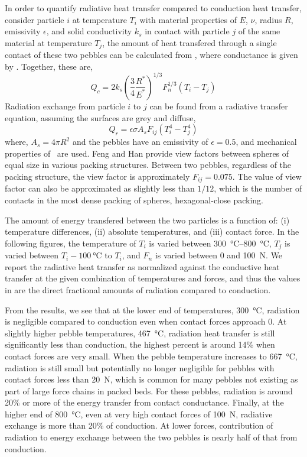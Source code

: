 In order to quantify radiative heat transfer compared to conduction heat transfer, consider particle $i$ at temperature $T_i$ with material properties of $E$, $\nu$, radius $R$, emissivity $\epsilon$, and solid conductivity $k_s$ in contact with particle $j$ of the same material at temperature $T_j$, the amount of heat transfered through a single contact of these two pebbles can be calculated from , where conductance is given by . Together, these are,
\begin{equation}
Q_c = 2k_s\left(\frac{3}{4}\frac{R^*}{E^*}\right)^{1/3}F_n^{1/3} (T_i - T_j)
\end{equation}
Radiation exchange from particle $i$ to $j$ can be found from a radiative transfer equation, assuming the surfaces are grey and diffuse,
\begin{equation}
Q_r = \epsilon\sigma A_sF_{ij}\left(T_i^{4} - T_j^{4}\right)
\end{equation}
where, $A_s = 4\pi R^2$ and the pebbles have an emissivity of $\epsilon = 0.5$, and mechanical properties of \lit~are used. Feng and Han provide view factors between spheres of equal size in various packing structures.\cite{Feng2012} Between two pebbles, regardless of the packing structure, the view factor is approximately $F_{ij} = 0.075$. The value of view factor can also be approximated as slightly less than $1/12$, which is the number of contacts in the most dense packing of spheres, hexagonal-close packing. 

The amount of energy transfered between the two particles is a function of: (i) temperature differences, (ii) absolute temperatures, and (iii) contact force. In the following figures, the temperature of $T_i$ is varied between \SIrange{300}{800}{\celsius}, $T_j$ is varied between $T_i - \SI{100}{\celsius}$ to $T_i$, and $F_n$ is varied between 0 and \SI{100}{\newton}. We report the radiative heat transfer as normalized against the conductive heat transfer at the given combination of temperatures and forces, and thus the values in  are the direct fractional amounts of radiation compared to conduction. 

From the results, we see that at the lower end of temperatures, \SI{300}{\celsius}, radiation is negligible compared to conduction even when contact forces approach 0. At slightly higher pebble temperatures, \SI{467}{\celsius}, radiation heat transfer is still significantly less than conduction, the highest percent is around 14\% when contact forces are very small. When the pebble temperature increases to \SI{667}{\celsius}, radiation is still small but potentially no longer negligible for pebbles with contact forces less than \SI{20}{\newton}, which is common for many pebbles not existing as part of large force chains in packed beds. For these pebbles, radiation is around 20\% or more of the energy transfer from contact conductance. Finally, at the higher end of \SI{800}{\celsius}, even at very high contact forces of \SI{100}{\newton}, radiative exchange is more than 20\% of conduction. At lower forces, contribution of radiation to energy exchange between the two pebbles is nearly half of that from conduction.

